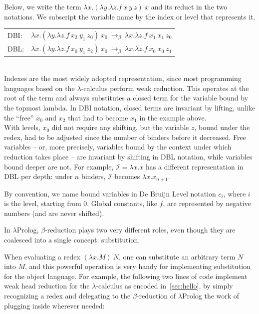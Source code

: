 \documentclass{these-ISSS}
\begin{document}
Below, we write the term $\lambda x.(\lambda y.\lambda z.f\ x\ y\ z)\ x$ and its
reduct in the two notations. We subscript the variable name by the index or
level that represents it.\\

\noindent
\begin{tabular}{ll}
DBI: & $\lambda x.(\lambda y.\lambda z.f\ x_2\ y_1\ z_0)\ x_0\ \to_\beta\ \lambda x.\lambda z.f\ x_1\ x_1\ z_0$\\
DBL: & $\lambda x.(\lambda y.\lambda z.f\ x_0\ y_1\ z_2)\ x_0\ \to_\beta\ \lambda x.\lambda z.f\ x_0\ x_0\ z_1$\\
\end{tabular}
~\\


Indexes are the most widely adopted representation, since most programming
languages based on the $\lambda$-calculus perform weak reduction. This
operates at the root of the term and always substitutes a closed term for the
variable bound by the topmost lambda. In DBI notation, closed terms are
invariant by lifting, unlike the ``free'' $x_0$ and $x_2$ that had to become
$x_1$ in the example above.\\
With levels, $x_0$ did not require any shifting, but the variable $z$, bound
under the redex, had to be adjusted since the number of binders before it
decreased. Free variables -- or, more precisely, variables bound by the context
under which reduction takes place -- are invariant by shifting in DBL notation,
while variables bound deeper are not. For example, $\mathcal{I} = \lambda x.x$
has a different representation in DBL per depth: under $n$ binders,
$\mathcal{I}$ becomes $\lambda x.x_{n+1}$.


By convention, we name bound variables in De Bruijn Level notation $c_i$, where
$i$ is the level, starting from $0$. Global constants, like $f$, are
represented by negative numbers (and are never shifted).


In $\lambda$Prolog, $\beta$-reduction plays two very different roles, even
though they are coalesced into a single concept: substitution.


When evaluating a redex $(\lambda x.M)\ N$, one can substitute an arbitrary
term $N$ into $M$, and this powerful operation is very handy for implementing substitution
for the object language. For example, the following two lines of code
implement weak head reduction for the $\lambda$-calculus as encoded
in~\cref{sec:hello}, by simply recognizing a redex and delegating to the
$\beta$-reduction of $\lambda$Prolog the work of plugging  inside
wherever needed:
\end{document}
